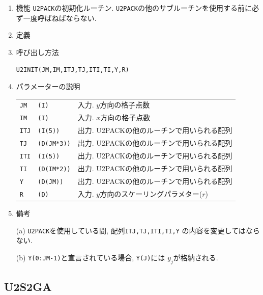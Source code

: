 \documentclass[a4j,fleqn]{jarticle}
\begin{document}
\begin{enumerate}

\item 機能 
{\tt U2PACK}の初期化ルーチン. 
{\tt U2PACK}の他のサブルーチンを使用する前に必ず一度呼ばねばならない.

\item 定義

\item 呼び出し方法 
    
{\tt U2INIT(JM,IM,ITJ,TJ,ITI,TI,Y,R)}
  
\item パラメーターの説明 
    
\begin{tabular}{lll}
{\tt JM} & {\tt (I)} & 入力. $y$方向の格子点数\\
{\tt IM} & {\tt (I)} & 入力. $x$方向の格子点数\\
{\tt ITJ}  & {\tt (I(5))}    & 出力. U2PACKの他のルーチンで用いられる配列\\
{\tt TJ}   & {\tt (D(JM*3))} & 出力. U2PACKの他のルーチンで用いられる配列\\
{\tt ITI}  & {\tt (I(5))}    & 出力. U2PACKの他のルーチンで用いられる配列\\
{\tt TI}   & {\tt (D(IM*2))} & 出力. U2PACKの他のルーチンで用いられる配列\\
{\tt Y}  & {\tt (D(JM))}     & 出力. U2PACKの他のルーチンで用いられる配列\\
{\tt R}  & {\tt (D)}     & 入力. $y$方向のスケーリングパラメター($r$)
\end{tabular}

\item 備考

(a) {\tt U2PACK}を使用している間, 配列{\tt ITJ,TJ,ITI,TI,Y}
の内容を変更してはならない.

(b) {\tt Y(0:JM-1)}と宣言されている場合, {\tt Y(J)}には
    $y_j$が格納される.

\end{enumerate}


\subsection{U2S2GA}
\end{document}
